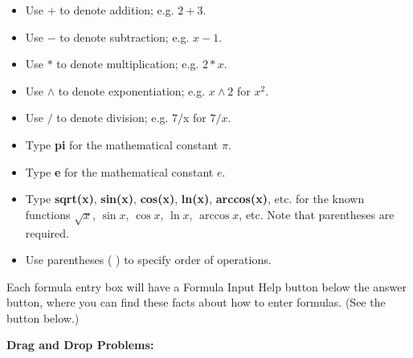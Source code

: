 \documentclass[pdftex, brazil, 12pt, twoside]{article}
\begin{document}
\begin{itemize}[noitemsep]
\item Use $+$ to denote addition; e.g. $2+3$.
\item Use $-$ to denote subtraction; e.g. $x-1$.
\item Use $*$ to denote multiplication; e.g. $2*x$.
\item Use $\wedge$ to denote exponentiation; e.g. $x\wedge 2$ for $x^2$.
\item Use $/$ to denote division; e.g. 7$/$x for $7/x$.
\item Type \textbf{pi} for the mathematical constant $\pi$.
\item Type \textbf{e} for the mathematical constant $e$.
\item Type \textbf{sqrt(x)}, \textbf{sin(x)}, \textbf{cos(x)}, \textbf{ln(x)},
  \textbf{arccos(x)}, etc. for the known functions $\sqrt{x}$, $\sin{x}$, $\cos{x}$,
  $\ln{x}$, $\arccos{x}$, etc. Note that parentheses are required.
\item Use parentheses ( ) to specify order of operations.
\end{itemize}

Each formula entry box will have a Formula Input Help button below the answer button,
where you can find these facts about how to enter formulas. (See the button below.)

\begin{figure}[H]
  \begin{center}
    \label{fig:exqst05}
  \end{center}
\end{figure}

\textbf{Drag and Drop Problems:}
\end{document}
